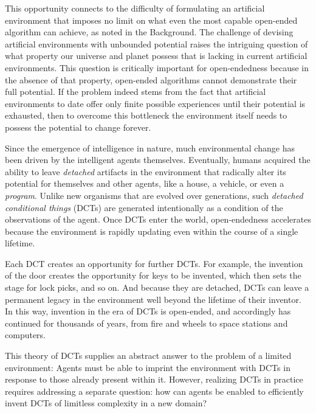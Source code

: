 \documentclass{article}
\begin{document}
This opportunity connects to the difficulty of formulating an artificial environment that imposes no limit on what even the most capable open-ended algorithm can achieve, as noted in the Background.
The challenge of devising artificial environments with unbounded potential
raises
the intriguing question of 
what property our universe and planet possess
that is lacking in current artificial environments. This question is
critically important for open-endedness because in the absence of that property, 
open-ended algorithms cannot demonstrate their full
potential.
If the problem indeed stems from the fact that artificial environments
to date offer only finite possible experiences until their potential is
exhausted, then to overcome this bottleneck the environment itself needs
to possess the potential to change forever.

Since the emergence of intelligence in nature, much environmental
change has been driven by the intelligent agents themselves.
Eventually, humans acquired the ability to leave
\emph{detached} artifacts in the environment that radically alter its
potential for themselves and other agents, like a house, a vehicle, or even a \emph{program}.
Unlike new organisms that are evolved over generations,
such \emph{detached conditional
things} (DCTs) are generated intentionally as a condition of the
observations of the agent. Once DCTs enter the world, open-endedness
accelerates because the environment is rapidly updating even within the
course of a single lifetime.

Each DCT creates an opportunity for further DCTs. For example, the
invention of the door creates the opportunity for keys to be invented,
which then sets the stage for lock picks, and so on. And because they
are detached, DCTs can leave a permanent legacy in the environment well
beyond the lifetime of their inventor. In this way, invention in the era
of DCTs is open-ended, and accordingly has continued for thousands of
years, from fire and wheels to space stations and computers.

This theory of DCTs supplies an abstract answer to the problem of a limited environment: Agents must be able to 
imprint the environment with DCTs in response to those already present within it.
However, realizing DCTs in practice requires addressing a separate question: how can agents be enabled to
efficiently invent DCTs of limitless complexity in a new domain? 
\end{document}
